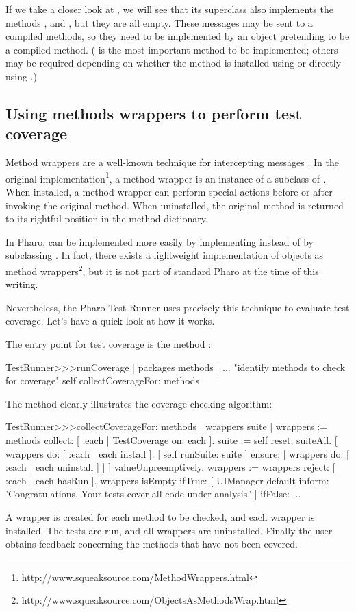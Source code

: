 \documentclass[a4paper,10pt,twoside]{book}
\begin{document}
If we take a closer look at , we will see that its superclass also implements the methods ,  and , but they are all empty.  These messages may be sent to a compiled methods, so they need to be implemented by an object pretending to be a compiled method.  ( is the most important method to be implemented; others may be required depending on whether the method is installed using  or directly using .)

\subsection{Using methods wrappers to perform test coverage}

Method wrappers are a well-known technique for intercepting messages \cite{Bran98a}.
In the original implementation\footnote{http://www.squeaksource.com/MethodWrappers.html}, a method wrapper is an instance of a subclass of . When installed, a method wrapper can perform special actions before or after invoking the original method.
When uninstalled, the original method is returned to its rightful position in the method dictionary.

In Pharo,  can be implemented more easily by implementing  instead of by subclassing . In fact, there exists a lightweight implementation of objects as method wrappers\footnote{http://www.squeaksource.com/ObjectsAsMethodsWrap.html}, but it is not part of standard Pharo at the time of this writing.

Nevertheless, the Pharo Test Runner uses precisely this technique to evaluate test coverage.
Let's have a quick look at how it works.

The entry point for test coverage is the method :
\begin{code}{}
TestRunner>>>runCoverage
	| packages methods |
	... "identify methods to check for coverage"
	self collectCoverageFor: methods
\end{code}

The method  clearly illustrates the coverage checking algorithm:
\begin{code}{}
TestRunner>>>collectCoverageFor: methods
	| wrappers suite |
	wrappers := methods collect: [ :each | TestCoverage on: each ].
	suite := self
		reset;
		suiteAll.
	[ wrappers do: [ :each | each install ].
	  [ self runSuite: suite ] ensure: [ wrappers do: [ :each | each uninstall ] ] ] valueUnpreemptively.
	wrappers := wrappers reject: [ :each | each hasRun ].
	wrappers isEmpty 
		ifTrue: 
			[ UIManager default inform: 'Congratulations. Your tests cover all code under analysis.' ]
		ifFalse: ...
\end{code}
A wrapper is created for each method to be checked, and each wrapper is installed.
The tests are run, and all wrappers are uninstalled.
Finally the user obtains feedback concerning the methods that have not been covered.
\end{document}
